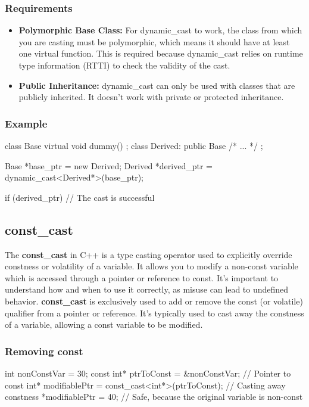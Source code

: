\documentclass{report}
\begin{document}
\begin{concept}
   \bigbreak \noindent 
   \subsubsection{Requirements}
   \begin{itemize}
        \item \textbf{Polymorphic Base Class:} For dynamic_cast to work, the class from which you are casting must be polymorphic, which means it should have at least one virtual function. This is required because dynamic_cast relies on runtime type information (RTTI) to check the validity of the cast.
        \item \textbf{Public Inheritance:} dynamic_cast can only be used with classes that are publicly inherited. It doesn’t work with private or protected inheritance.
   \end{itemize}

   \bigbreak \noindent 
   \subsubsection{Example}
   \bigbreak \noindent 
   \begin{cppcode}
class Base { virtual void dummy() {} };
class Derived: public Base { /* ... */ };

Base *base_ptr = new Derived;
Derived *derived_ptr = dynamic_cast<Derived*>(base_ptr);

if (derived_ptr) {
    // The cast is successful
}
   \end{cppcode}
    

    \bigbreak \noindent 
    \subsection{const\_cast}
    \bigbreak \noindent 
    \begin{concept}
        The \textbf{const\_cast} in C++ is a type casting operator used to explicitly override constness or volatility of a variable. It allows you to modify a non-const variable which is accessed through a pointer or reference to const. It's important to understand how and when to use it correctly, as misuse can lead to undefined behavior.
        \bigbreak \noindent 
        \textbf{const\_cast} is exclusively used to add or remove the const (or volatile) qualifier from a pointer or reference. It's typically used to cast away the constness of a variable, allowing a const variable to be modified.
    \end{concept}
    \subsubsection{Removing const}
    \bigbreak \noindent 
    \begin{cppcode}
    int nonConstVar = 30;
    const int* ptrToConst = &nonConstVar; // Pointer to const
    int* modifiablePtr = const_cast<int*>(ptrToConst); // Casting away constness
    *modifiablePtr = 40; // Safe, because the original variable is non-const


\end{cppcode}
\end{concept}
\end{document}
